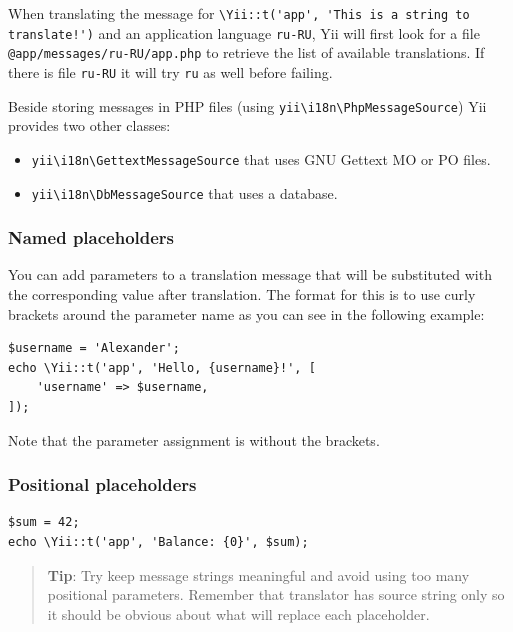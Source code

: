 When translating the message for \lstinline|\Yii::t('app', 'This is a string to translate!')| and an application language \lstinline|ru-RU|, Yii
will first look for a file \lstinline|@app/messages/ru-RU/app.php| to retrieve the list of available translations.
If there is file \lstinline|ru-RU| it will try \lstinline|ru| as well before failing.

Beside storing messages in PHP files (using \texttt{yii{\allowbreak{}\textbackslash}i18n{\allowbreak{}\textbackslash}PhpMessageSource}) Yii provides two other
classes:

\begin{itemize}
\item \texttt{yii{\allowbreak{}\textbackslash}i18n{\allowbreak{}\textbackslash}GettextMessageSource} that uses GNU Gettext MO or PO files.
\item \texttt{yii{\allowbreak{}\textbackslash}i18n{\allowbreak{}\textbackslash}DbMessageSource} that uses a database.
\end{itemize}
\subsubsection{Named placeholders}
You can add parameters to a translation message that will be substituted with the corresponding value after translation.
The format for this is to use curly brackets around the parameter name as you can see in the following example:

\lstset{language=php}\begin{lstlisting}
$username = 'Alexander';
echo \Yii::t('app', 'Hello, {username}!', [
    'username' => $username,
]);
\end{lstlisting}
Note that the parameter assignment is without the brackets.

\subsubsection{Positional placeholders}
\lstset{language=php}\begin{lstlisting}
$sum = 42;
echo \Yii::t('app', 'Balance: {0}', $sum);
\end{lstlisting}
\begin{quote}\textbf{Tip}: Try keep message strings meaningful and avoid using too many positional parameters. Remember that
translator has source string only so it should be obvious about what will replace each placeholder.

\end{quote}
